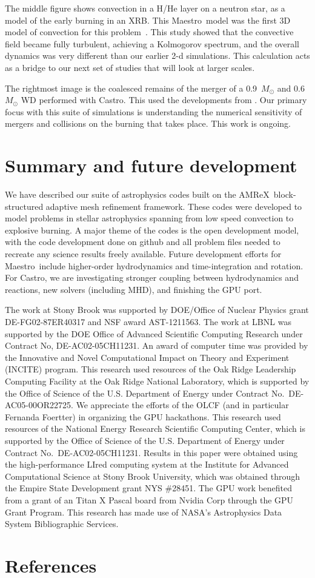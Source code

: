 \documentclass[a4paper]{jpconf}
\newcommand{\maestro}{{\sffamily Maestro}}
\newcommand{\castro}{{\sffamily Castro}}
\newcommand{\amrex}{{\sffamily AMReX}}
\begin{document}
The middle figure shows convection in a H/He layer on a neutron star,
as a model of the early burning in an XRB.  This \maestro\ model was
the first 3D model of convection for this problem~\cite{xrb3}.  This
study showed that the convective field became fully turbulent,
achieving a Kolmogorov spectrum, and the overall dynamics was very
different than our earlier 2-d simulations.  This calculation acts as 
a bridge to our next set of studies that will look at larger scales.

The rightmost image is the coalesced remains of the merger of a
0.9~$M_\odot$ and 0.6~$M_\odot$ WD performed with \castro.  This used
the developments from \cite{wdmergerI}.  Our primary focus with this
suite of simulations is understanding the numerical sensitivity of
mergers and collisions on the burning that takes place.  This work
is ongoing.


\section{Summary and future development}

We have described our suite of astrophysics codes built on the
\amrex\ block-structured adaptive mesh refinement framework.  These
codes were developed to model problems in stellar astrophysics
spanning from low speed convection to explosive burning.  A major
theme of the codes is the open development model, with the code
development done on github and all problem files needed to recreate
any science results freely available.  Future development efforts for
\maestro\ include higher-order hydrodynamics and time-integration and
rotation.  For \castro, we are investigating stronger coupling between
hydrodynamics and reactions, new solvers (including MHD), and
finishing the GPU port.



\ack The work at Stony Brook was supported by DOE/Office of Nuclear
Physics grant DE-FG02-87ER40317 and NSF award AST-1211563.  The work
at LBNL was supported by the DOE Office of Advanced Scientific
Computing Research under Contract No, DE-AC02-05CH11231. An award of
computer time was provided by the Innovative and Novel Computational
Impact on Theory and Experiment (INCITE) program.  This research used
resources of the Oak Ridge Leadership Computing Facility at the Oak
Ridge National Laboratory, which is supported by the Office of Science
of the U.S. Department of Energy under Contract
No.\ DE-AC05-00OR22725.  We appreciate the efforts of the OLCF (and in
particular Fernanda Foertter) in organizing the GPU hackathons.  This
research used resources of the National Energy Research Scientific
Computing Center, which is supported by the Office of Science of the
U.S. Department of Energy under Contract No.\ DE-AC02-05CH11231.
Results in this paper were obtained using the high-performance LIred
computing system at the Institute for Advanced Computational Science
at Stony Brook University, which was obtained through the Empire State
Development grant NYS \#28451.  The GPU work benefited from a grant of
an Titan X Pascal board from Nvidia Corp through the GPU Grant
Program.  This research has made use of NASA's Astrophysics Data
System Bibliographic Services.

\section*{References}



\end{document}
